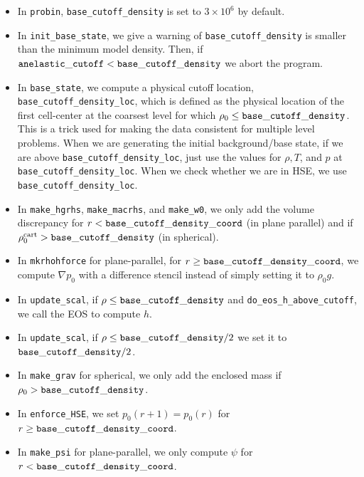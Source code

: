 \begin{itemize}

\item In {\tt probin}, {\tt base\_cutoff\_density} is set to $3\times 10^6$ by default.

\item In {\tt init\_base\_state}, we give a warning of {\tt base\_cutoff\_density}
  is smaller than the minimum model density.  Then, if ${\tt anelastic\_cutoff} 
  < {\tt base\_cutoff\_density}$ we abort the program.

\item In {\tt base\_state}, we compute a physical cutoff location,
  {\tt base\_cutoff\_density\_loc}, which is defined as the physical
  location of the first cell-center at the coarsest level for which
  $\rho_0 \le {\tt base\_cutoff\_density}$.  This is a trick used for making
  the data consistent for multiple level problems.  When we are generating the 
  initial background/base state, if we are above {\tt base\_cutoff\_density\_loc}, 
  just use the values for $\rho,T$, and $p$ at {\tt base\_cutoff\_density\_loc}.
  When we check whether we are in HSE, we use {\tt base\_cutoff\_density\_loc}.

\item In {\tt make\_hgrhs}, {\tt make\_macrhs}, and {\tt make\_w0}, 
  we only add the volume discrepancy for $r < {\tt base\_cutoff\_density\_coord}$
  (in plane parallel) and if $\rho_0^{\rm cart} > {\tt base\_cutoff\_density}$ 
  (in spherical).

\item In {\tt mkrhohforce} for plane-parallel, for
  $r \ge {\tt base\_cutoff\_density\_coord}$, we
  compute $\nabla p_0$ with a difference stencil instead of simply
  setting it to $\rho_0 g$.

\item In {\tt update\_scal}, if $\rho \le {\tt base\_cutoff\_density}$
   and {\tt do\_eos\_h\_above\_cutoff}, we call the EOS to compute $h$.

\item In {\tt update\_scal}, if $\rho \le {\tt base\_cutoff\_density}/2$
   we set it to ${\tt base\_cutoff\_density}/2$.

\item In {\tt make\_grav} for spherical, we only add the enclosed mass if
  $\rho_0 > {\tt base\_cutoff\_density}$.

\item In {\tt enforce\_HSE}, we set $p_0(r+1) = p_0(r)$ for 
  $r \ge {\tt base\_cutoff\_density\_coord}$.

\item In {\tt make\_psi} for plane-parallel, we only compute $\psi$ for 
  $r < {\tt base\_cutoff\_density\_coord}$.

\end{itemize}

